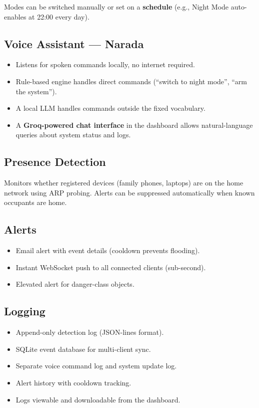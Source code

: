 \documentclass[12pt,a4paper]{article}
\begin{document}
Modes can be switched manually or set on a \textbf{schedule}
(e.g., Night Mode auto-enables at 22:00 every day).

\subsection*{Voice Assistant — Narada}
\begin{itemize}[leftmargin=2em, itemsep=2pt]
  \item Listens for spoken commands locally, no internet required.
  \item Rule-based engine handles direct commands (``switch to night mode'',
        ``arm the system'').
  \item A local LLM handles commands outside the fixed vocabulary.
  \item A \textbf{Groq-powered chat interface} in the dashboard allows
        natural-language queries about system status and logs.
\end{itemize}

\subsection*{Presence Detection}
Monitors whether registered devices (family phones, laptops) are on the
home network using ARP probing. Alerts can be suppressed automatically
when known occupants are home.

\subsection*{Alerts}
\begin{itemize}[leftmargin=2em, itemsep=2pt]
  \item Email alert with event details (cooldown prevents flooding).
  \item Instant WebSocket push to all connected clients (sub-second).
  \item Elevated alert for danger-class objects.
\end{itemize}

\subsection*{Logging}
\begin{itemize}[leftmargin=2em, itemsep=2pt]
  \item Append-only detection log (JSON-lines format).
  \item SQLite event database for multi-client sync.
  \item Separate voice command log and system update log.
  \item Alert history with cooldown tracking.
  \item Logs viewable and downloadable from the dashboard.
\end{itemize}
\end{document}
